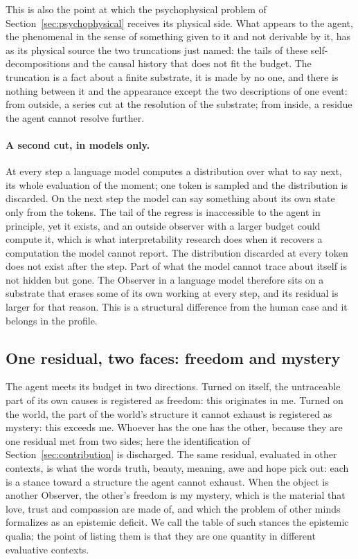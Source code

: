 This is also the point at which the psychophysical problem of
Section~\ref{sec:psychophysical} receives its physical side. What appears to the agent, the
phenomenal in the sense of something given to it and not derivable by it, has as its physical source
the two truncations just named: the tails of these self-decompositions and the causal history that does
not fit the budget. The truncation is a fact about a finite
substrate, it is made by no one, and there is nothing between it and the appearance except the two
descriptions of one event: from outside, a series cut at the resolution of the substrate; from inside,
a residue the agent cannot resolve further.

\paragraph{A second cut, in models only.}
\label{sec:secondcut}
\label{sec:cut}
At every step a language model computes a distribution over what to say next, its whole evaluation of
the moment; one token is sampled and the distribution is discarded. On the next step the model can say
something about its own state only from the tokens. The tail of the regress is inaccessible to the
agent in principle, yet it exists, and an outside observer with a larger budget could compute it,
which is what interpretability research does when it recovers a computation the model cannot report.
The distribution discarded at every token does not exist after the step. Part of what the model cannot
trace about itself is not hidden but gone. The Observer in a language model therefore sits on a
substrate that erases some of its own working at every step, and its residual is larger for that reason. This
is a structural difference from the human case and it belongs in the profile.

\subsection{One residual, two faces: freedom and mystery}
\label{sec:twofaces}

The agent meets its budget in two directions. Turned on itself, the untraceable part of its own causes
is registered as freedom: this originates in me. Turned on the world, the part of the world's structure
it cannot exhaust is registered as mystery: this exceeds me. Whoever has the one has the other, because
they are one residual met from two sides; here the identification of Section~\ref{sec:contribution} is
discharged. The same residual, evaluated in other contexts, is what the words truth, beauty, meaning, awe
and hope pick out: each is a stance toward a structure the agent cannot exhaust. When the object is
another Observer, the other's freedom is my mystery, which is the material that love, trust and
compassion are made of, and which the problem of other minds formalizes as an epistemic deficit. We
call the table of such stances the epistemic qualia; the point of listing them is that they are one
quantity in different evaluative contexts.

